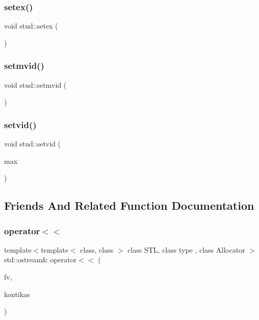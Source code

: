 \mbox{\label{structstud_a078cb288fc9ca808c827a079f0bdf724}} 
\subsubsection{\texorpdfstring{setex()}{setex()}\hspace{0.1cm}{\footnotesize\ttfamily [2/2]}}
{\footnotesize\ttfamily void stud\+::setex (\begin{DoxyParamCaption}{ }\end{DoxyParamCaption})}

\mbox{\label{structstud_a5f882c5ca0c4c5351aaeebc76c86faaa}} 
\subsubsection{\texorpdfstring{setmvid()}{setmvid()}}
{\footnotesize\ttfamily void stud\+::setmvid (\begin{DoxyParamCaption}{ }\end{DoxyParamCaption})}

\mbox{\label{structstud_ae8ce76b8a594db8ed15a0a8116d1aa72}} 
\subsubsection{\texorpdfstring{setvid()}{setvid()}}
{\footnotesize\ttfamily void stud\+::setvid (\begin{DoxyParamCaption}\item[{int}]{max }\end{DoxyParamCaption})}



\subsection{Friends And Related Function Documentation}
\mbox{\label{structstud_a83c97f941e4f007dd1ba45fe029e0984}} 
\subsubsection{\texorpdfstring{operator$<$$<$}{operator<<}}
{\footnotesize\ttfamily template$<$template$<$ class, class $>$ class S\+TL, class type , class Allocator $>$ \\
std\+::ostream\& operator$<$$<$ (\begin{DoxyParamCaption}\item[{std\+::ostream \&}]{fv,  }\item[{S\+TL$<$ type, Allocator $>$ \&}]{kontikas }\end{DoxyParamCaption})\hspace{0.3cm}{\ttfamily [friend]}}

